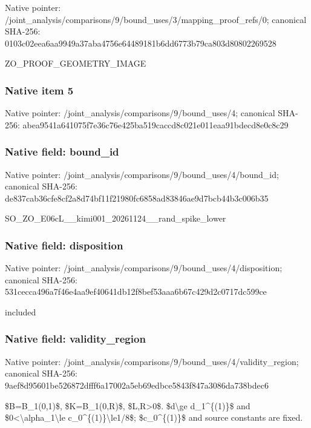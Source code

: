\documentclass[10pt,a4paper]{article}
\begin{document}
Native pointer: /joint\_analysis/comparis\allowbreak{}ons/9/bound\_uses/3/mappi\allowbreak{}ng\_proof\_refs/0; canonical SHA-256: 0103c02eea6aa9949a37aba4\allowbreak{}756e64489181b6dd6773b79c\allowbreak{}a803d80802269528


ZO\_PROOF\_GEOMETRY\_IMAGE


\subsubsection{Native item 5}


Native pointer: /joint\_analysis/comparis\allowbreak{}ons/9/bound\_uses/4; canonical SHA-256: abea9541a641075f7e36c76e\allowbreak{}425ba519caccd8c021e011ea\allowbreak{}a91bdecd8e0c8c29



\subsubsection{Native field: bound\_id}


Native pointer: /joint\_analysis/comparis\allowbreak{}ons/9/bound\_uses/4/bound\allowbreak{}\_id; canonical SHA-256: de837cab36cfe8cf2a8d74bf\allowbreak{}11f21980fc6858ad83846ae9\allowbreak{}d7bcb44b3c006b35


SO\_ZO\_E06cL\_\_kimi001\_202\allowbreak{}61124\_\_rand\_spike\_lower


\subsubsection{Native field: disposition}


Native pointer: /joint\_analysis/comparis\allowbreak{}ons/9/bound\_uses/4/dispo\allowbreak{}sition; canonical SHA-256: 531cecca496a7f46e4aa9ef4\allowbreak{}0641db12f8bef53aaa6b67c4\allowbreak{}29d2c0717dc599ce


included


\subsubsection{Native field: validity\_region}


Native pointer: /joint\_analysis/comparis\allowbreak{}ons/9/bound\_uses/4/valid\allowbreak{}ity\_region; canonical SHA-256: 9aef8d95601be526872dfff6\allowbreak{}a17002a5eb69edbce5843f84\allowbreak{}7a3086da738bdec6


\$B=B\_1(0,1)\$, \$K=B\_1(0,R)\$, \$L,R>0\$. \$d\textbackslash{}ge d\_1\textasciicircum{}\{(1)\}\$ and \$0<\textbackslash{}alpha\_1\textbackslash{}le c\_0\textasciicircum{}\{(1)\}\textbackslash{}le1/8\$; \$c\_0\textasciicircum{}\{(1)\}\$ and source constants are fixed.
\end{document}
